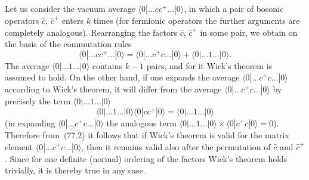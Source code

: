 Let us consider the vacuum average $\langle 0|\ldots cc^+\ldots|0\rangle$, in which a pair of bosonic operators $\hat{c}$, $\hat{c}^+$ enters $k$ times (for fermionic operators the further arguments are completely analogous). Rearranging the factors $\hat{c}$, $\hat{c}^+$ in some pair, we obtain on the basis of the commutation rules
\begin{equation}
\langle 0|\ldots cc^+\ldots|0\rangle = \langle 0|\ldots c^+c\ldots|0\rangle + \langle 0|\ldots 1\ldots|0\rangle.
\tag{77.2}
\end{equation}
The average $\langle 0|\ldots 1\ldots|0\rangle$ contains $k-1$ pairs, and for it Wick's theorem is assumed to hold. On the other hand, if one expands the average $\langle 0|\ldots c^+c\ldots|0\rangle$ according to Wick's theorem, it will differ from the average $\langle 0|\ldots c^+c\ldots|0\rangle$ by precisely the term $\langle 0|\ldots 1\ldots|0\rangle$
\[
\langle 0|\ldots 1\ldots|0\rangle\langle 0|cc^+|0\rangle = \langle 0|\ldots 1\ldots|0\rangle
\]
(in expanding $\langle 0|\ldots c^+c\ldots|0\rangle$ the analogous term $\langle 0|\ldots 1\ldots|0\rangle \times \langle 0|c^+c|0\rangle = 0$). Therefore from~(77.2) it follows that if Wick's theorem is valid for the matrix element $\langle 0|\ldots c^+c\ldots|0\rangle$, then it remains valid also after the permutation of $\hat{c}$ and $\hat{c}^+$. Since for one definite (normal) ordering of the factors Wick's theorem holds trivially, it is thereby true in any case.


